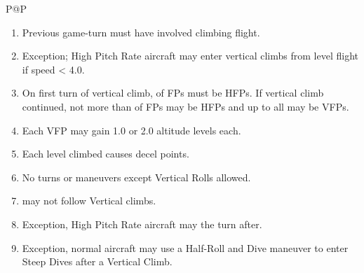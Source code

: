 \begin{twocolumntablefloat}
\begin{twocolumntable}
\begin{tabularx}{\linewidth}{P@{\hspace{1em}}P}
            \begin{enumerate}[nosep]
                \item Previous game-turn must have involved climbing flight.
                \item Exception; High Pitch Rate aircraft may enter vertical climbs from level flight if speed < 4.0.
                \item On first turn of vertical climb, {\onethird} of FPs must be HFPs. If vertical climb continued, not more than {\onethird} of FPs may be HFPs and up to all may be VFPs.
                \item Each VFP may gain 1.0 or 2.0 altitude levels each.
                \item Each level climbed causes  decel points.
                \item No turns or maneuvers except Vertical Rolls allowed.
                \item {} may not follow Vertical climbs.
                \item Exception, High Pitch Rate aircraft may  the turn after.
                \item Exception, normal aircraft may use a Half-Roll and Dive maneuver to enter Steep Dives after a Vertical Climb.
            \end{enumerate}

            \\
            \bottomrule
        \end{tabularx}
    \end{twocolumntable}
\end{twocolumntablefloat}

